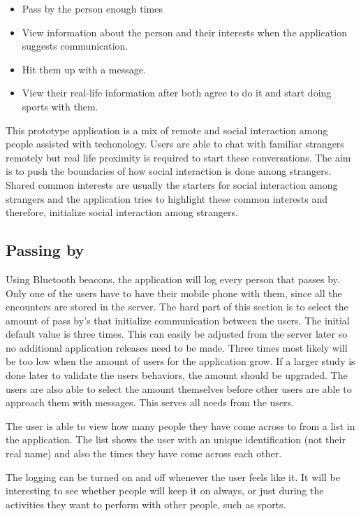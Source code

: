 \begin{itemize}
	\item Pass by the person enough times
	\item View information about the person and their interests when the application suggests communication.
	\item Hit them up with a message.
	\item View their real-life information after both agree to do it and start doing sports with them.
\end{itemize}

This prototype application is a mix of remote and social interaction among people assisted with techonology. Users are able to chat with familiar strangers remotely but real life proximity is required to start these conversations. The aim is to push the boundaries of how social interaction is done among strangers. Shared common interests are usually the starters for social interaction among strangers and the application tries to highlight these common interests and therefore, initialize social interaction among strangers.

\subsection{Passing by}

Using Bluetooth beacons, the application will log every person that passes by. Only one of the users have to have their mobile phone with them, since all the encounters are stored in the server. The hard part of this section is to select the amount of pass by's that initialize communication between the users. The initial default value is three times. This can easily be adjusted from the server later so no additional application releases need to be made. Three times most likely will be too low when the amount of users for the application grow. If a larger study is done later to validate the users behaviors, the amount should be upgraded. The users are also able to select the amount themselves before other users are able to approach them with messages. This serves all needs from the users.

The user is able to view how many people they have come across to from a list in the application. The list shows the user with an unique identification (not their real name) and also the times they have come across each other.

The logging can be turned on and off whenever the user feels like it. It will be interesting to see whether people will keep it on always, or just during the activities they want to perform with other people, such as sports.


